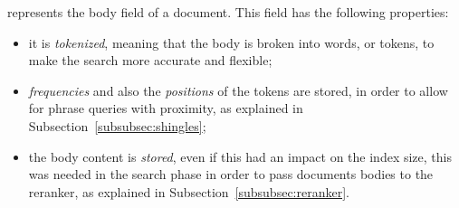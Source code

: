 represents the body field of a document. This field has the following properties:

\begin{itemize}
	\item it is \emph{tokenized}, meaning that the body is broken into words, or tokens, to make the search more accurate and flexible;
	\item \emph{frequencies} and also the \emph{positions} of the tokens are stored, in order to allow for phrase queries with proximity, as explained in Subsection~\ref{subsubsec:shingles};
	\item the body content is \emph{stored}, even if this had an impact on the index size, this was needed in the search phase in order to pass documents bodies to the reranker, as explained in Subsection~\ref{subsubsec:reranker}.
\end{itemize}
